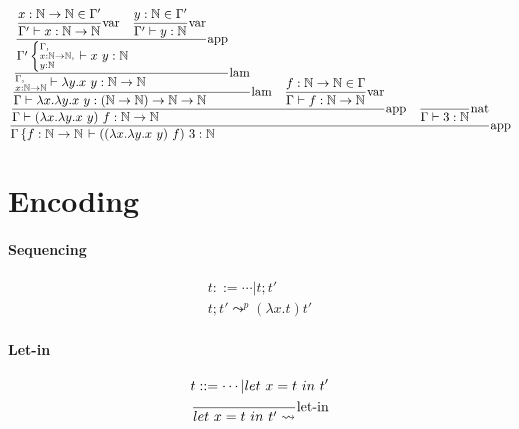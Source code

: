 \documentclass{article}
\newcommand{\st}[3][]{\ensuremath{\displaystyle\frac{#3\hfill}{#2\hfill} \text{#1}}}
\newcommand{\N}{\ensuremath \mathbb N}
\newcommand{\lam}[2]{\ensuremath{\lambda#1.#2}}
\begin{document}
\begin{equation*}
    \st[app]{
        \Gamma\left\{f:\N\to\N\right. \vdash ((\lam{x}{\lam{y}{x\ y}})\ f)\ 3:\N
    }{
        \st[app]{
            \Gamma\vdash (\lam{x}{\lam{y}{x\ y}})\ f: \N\to\N
        }{
            \st[lam]{
                \Gamma\vdash \lam{x}{\lam{y}{x\ y}}: (\N\to\N)\to\N\to\N
            }{
                \st[lam]{
                    \substack{\Gamma,\hfill\\x:\N\to\N}\vdash \lam{y}{x\ y}:\N\to\N
                }{
                    \st[app]{
                        \Gamma' \left\{ \substack{\Gamma,\hfill\\x:\N\to\N,\\y:\N\hfill} \right. \vdash x\ y:\N
                    }{
                        \st[var]{
                            \Gamma'\vdash x:\N\to\N
                        }{
                            x:\N\to\N\in\Gamma'
                        }
                        \quad
                        \st[var]{
                            \Gamma'\vdash y:\N
                        }{
                            y:\N\in\Gamma'
                        }
                    }
                }
            }
            \quad
            \st[var]{
                \Gamma\vdash f:\N\to\N
            }{
                f:\N\to\N\in\Gamma
            }
        }
        \quad
        \st[nat]{
            \Gamma\vdash 3:\N
        }{
        }
    }
\end{equation*}

\section{Encoding}
\paragraph{Sequencing}
\begin{align*}
    t ::= \cdots|t;t' \\
    t;t' \leadsto^p (\lam{x}{t})t'
\end{align*}

\paragraph{Let-in}
\begin{align*}
    t ::= \cdots | let\ x=t\ in\ t' \\
    \st[let-in]{
        let\ x=t\ in\ t' \leadsto 
    }{
    }
\end{align*}
\end{document}
